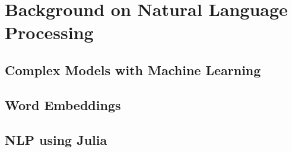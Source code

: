 \chapter{Background on Natural Language Processing}
\section{Complex Models with Machine Learning}
\section{Word Embeddings}
\section{NLP using Julia}